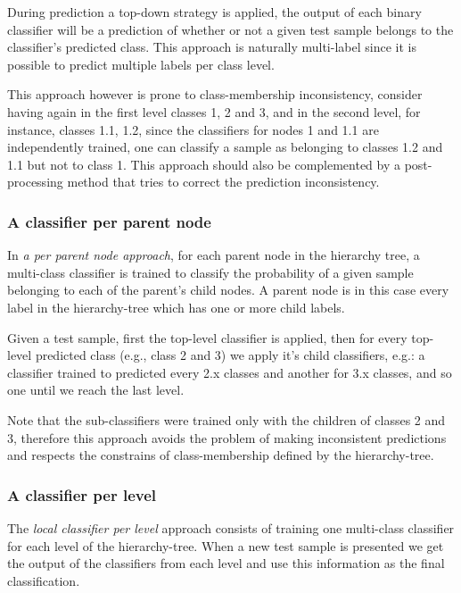 \documentclass[11pt,a4paper]{article}
\begin{document}
During prediction a top-down strategy is applied, the output of each binary classifier will be a
prediction of whether or not a given test sample belongs to the classifier’s predicted class. This
approach is naturally multi-label since it is possible to predict multiple labels per class level.

This approach however is prone to class-membership inconsistency, consider having again in the first
level classes 1, 2 and 3, and in the second level, for instance, classes 1.1, 1.2, since the
classifiers for nodes 1 and 1.1 are independently trained, one can classify a sample as belonging to
classes 1.2 and 1.1 but not to class 1. This approach should also be complemented by a
post-processing method that tries to correct the prediction inconsistency.


\subsubsection{A classifier per parent node} %
In \textit{a per parent node approach}, for each parent node in the hierarchy tree, a multi-class
classifier is trained to classify the probability of a given sample belonging to each of the parent's
child nodes. A parent node is in this case every label in the hierarchy-tree which has one or more
child labels.

Given a test sample, first the top-level classifier is applied, then for every top-level
predicted class (e.g., class 2 and 3) we apply it's child classifiers, e.g.: a classifier
trained to predicted every 2.x classes and another for 3.x classes, and so one until we reach the
last level.

Note that the sub-classifiers were trained only with the children of classes 2 and 3, therefore
this approach avoids the problem of making inconsistent predictions and respects the constrains
of class-membership defined by the hierarchy-tree.


\subsubsection{A classifier per level} %
The \textit{local classifier per level} approach consists of training one multi-class classifier
for each level of the hierarchy-tree. When a new test sample is presented we get the output of the
classifiers from each level and use this information as the final classification.
\end{document}
